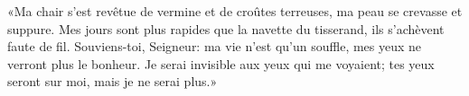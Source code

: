 «Ma chair s’est revêtue de vermine et de croûtes terreuses,
	ma peau se crevasse et suppure.
Mes jours sont plus rapides que la navette du tisserand,
	ils s’achèvent faute de fil.
Souviens-toi, Seigneur: ma vie n’est qu’un souffle,
	mes yeux ne verront plus le bonheur.
Je serai invisible aux yeux qui me voyaient;
	tes yeux seront sur moi, mais je ne serai plus.»
